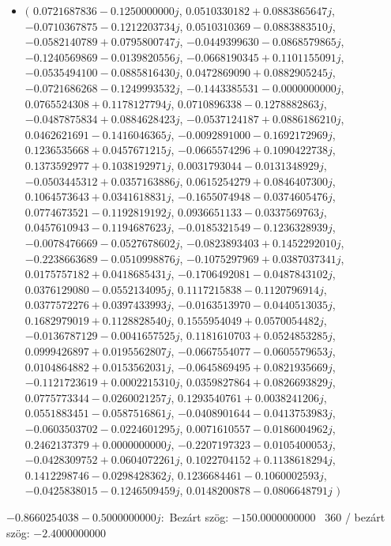 \documentclass[14pt,a4paper]{article}
\begin{document}
\begin{itemize}
\item
$\big($
$0.0721687836-0.1250000000j$, $0.0510330182+0.0883865647j$, $-0.0710367875-0.1212203734j$, $0.0510310369-0.0883883510j$, $-0.0582140789+0.0795800747j$, $-0.0449399630-0.0868579865j$, $-0.1240569869-0.0139820556j$, $-0.0668190345+0.1101155091j$, $-0.0535494100-0.0885816430j$, $0.0472869090+0.0882905245j$, $-0.0721686268-0.1249993532j$, $-0.1443385531-0.0000000000j$, $0.0765524308+0.1178127794j$, $0.0710896338-0.1278882863j$, $-0.0487875834+0.0884628423j$, $-0.0537124187+0.0886186210j$, $0.0462621691-0.1416046365j$, $-0.0092891000-0.1692172969j$, $0.1236535668+0.0457671215j$, $-0.0665574296+0.1090422738j$, $0.1373592977+0.1038192971j$, $0.0031793044-0.0131348929j$, $-0.0503445312+0.0357163886j$, $0.0615254279+0.0846407300j$, $0.1064573643+0.0341618831j$, $-0.1655074948-0.0374605476j$, $0.0774673521-0.1192819192j$, $0.0936651133-0.0337569763j$, $0.0457610943-0.1194687623j$, $-0.0185321549-0.1236328939j$, $-0.0078476669-0.0527678602j$, $-0.0823893403+0.1452292010j$, $-0.2238663689-0.0510998876j$, $-0.1075297969+0.0387037341j$, $0.0175757182+0.0418685431j$, $-0.1706492081-0.0487843102j$, $0.0376129080-0.0552134095j$, $0.1117215838-0.1120796914j$, $0.0377572276+0.0397433993j$, $-0.0163513970-0.0440513035j$, $0.1682979019+0.1128828540j$, $0.1555954049+0.0570054482j$, $-0.0136787129-0.0041657525j$, $0.1181610703+0.0524853285j$, $0.0999426897+0.0195562807j$, $-0.0667554077-0.0605579653j$, $0.0104864882+0.0153562031j$, $-0.0645869495+0.0821935669j$, $-0.1121723619+0.0002215310j$, $0.0359827864+0.0826693829j$, $0.0775773344-0.0260021257j$, $0.1293540761+0.0038241206j$, $0.0551883451-0.0587516861j$, $-0.0408901644-0.0413753983j$, $-0.0603503702-0.0224601295j$, $0.0071610557-0.0186004962j$, $0.2462137379+0.0000000000j$, $-0.2207197323-0.0105400053j$, $-0.0428309752+0.0604072261j$, $0.1022704152+0.1138618294j$, $0.1412298746-0.0298428362j$, $0.1236684461-0.1060002593j$, $-0.0425838015-0.1246509459j$, $0.0148200878-0.0806648791j$
$\big)$
\end{itemize}
$-0.8660254038-0.5000000000j$:\
Bezárt szög: $-150.0000000000$ \
360 / bezárt szög: $-2.4000000000$\
\end{document}
